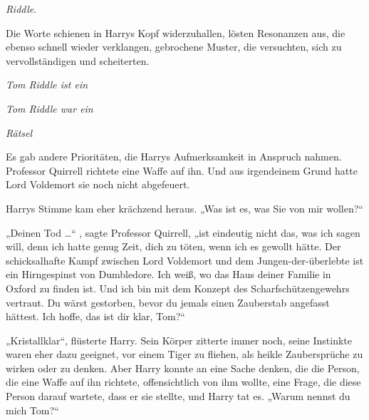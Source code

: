 
 \emph{Riddle}.

\hplettrineextrapara
Die Worte schienen in Harrys Kopf widerzuhallen, lösten Resonanzen aus, die ebenso schnell wieder verklangen, gebrochene Muster, die versuchten, sich zu vervollständigen und scheiterten.

\emph{Tom Riddle ist ein}

\emph{Tom Riddle war ein}

\emph{Rätsel}

Es gab andere Prioritäten, die Harrys Aufmerksamkeit in Anspruch nahmen.
Professor Quirrell richtete eine Waffe auf ihn.
Und aus irgendeinem Grund hatte Lord Voldemort sie noch nicht abgefeuert.

Harrys Stimme kam eher krächzend heraus.
„Was ist es, was Sie von mir wollen?“

„Deinen Tod …“ , sagte Professor Quirrell, „ist eindeutig nicht das, was ich sagen will, denn ich hatte genug Zeit, dich zu töten, wenn ich es gewollt hätte. Der schicksalhafte Kampf zwischen Lord Voldemort und dem Jungen-der-überlebte ist ein Hirngespinst von Dumbledore. Ich weiß, wo das Haus deiner Familie in Oxford zu finden ist. Und ich bin mit dem Konzept des Scharfschützengewehrs vertraut. Du wärst gestorben, bevor du jemals einen Zauberstab angefasst hättest. Ich hoffe, das ist dir klar, Tom?“

„Kristallklar“, flüsterte Harry.
Sein Körper zitterte immer noch, seine Instinkte waren eher dazu geeignet, vor einem Tiger zu fliehen, als heikle Zaubersprüche zu wirken oder zu denken. Aber Harry konnte an eine Sache denken, die die Person, die eine Waffe auf ihn richtete, offensichtlich von ihm wollte, eine Frage, die diese Person darauf wartete, dass er sie stellte, und Harry tat es.
„Warum nennst du mich Tom?“

